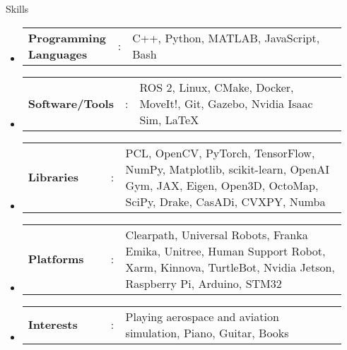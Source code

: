 \documentclass{resume}
\newcommand{\resumeHeadingListStart}{
  \begin{itemize}[leftmargin=0.15in, label={}]
    
}
\newcommand{\resumeHeadingListEnd}{\end{itemize}}
\newcommand{\resumeSectionType}[3]{
  \hspace{-1.3em}\item\begin{tabular*}{0.5\textwidth}[t]{
    p{0.25\linewidth}p{0.02\linewidth}p{0.67\linewidth}
  }
  \normalsize
    \textbf{#1} & #2 & {#3}
  \end{tabular*}\vspace{-8pt}
}
\begin{document}


\vspace{-0.5em}
\begin{rSection}{Skills}
\resumeHeadingListStart{}
\resumeSectionType{Programming Languages}{:}{C++, Python, MATLAB, JavaScript, Bash}
\resumeSectionType{Software/Tools}{:}{ROS 2, Linux, CMake, Docker, MoveIt!, Git, Gazebo, Nvidia Isaac Sim, \LaTeX}
\resumeSectionType{Libraries}{:}{PCL, OpenCV, PyTorch, TensorFlow, NumPy, Matplotlib, scikit-learn,  OpenAI Gym, JAX, Eigen, Open3D, OctoMap, SciPy, Drake, CasADi, CVXPY, Numba}
\resumeSectionType{Platforms}{:}{Clearpath, Universal Robots, Franka Emika, Unitree, Human Support Robot, Xarm, Kinnova, TurtleBot, Nvidia Jetson, Raspberry Pi, Arduino, STM32}
\resumeSectionType{Interests}{:}{Playing aerospace and aviation simulation, Piano, Guitar, Books}
\resumeHeadingListEnd{}
\end{rSection}






\newpage
\thispagestyle{reference}
\end{document}
